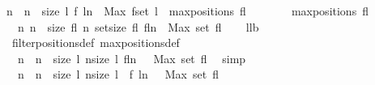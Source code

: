\begin{isabellebody}
{\isacharbrackleft}n\ {\isachardot}\ n\ {\isacharless}{\isacharminus}\ {\isacharbrackleft}{}{\isachardot}{\isachardot}{\isacharless}size\ l{\isacharbrackright}{\isacharcomma}\ f\ {\isacharparenleft}l{\isacharbang}n{\isacharparenright}\ {\isasymge}\ Max\ {\isacharparenleft}f{\isacharbackquote}{\isacharparenleft}set\ l{\isacharparenright}{\isacharparenright}{\isacharbrackright}{\isachardoublequoteclose}\ {\isacharparenleft}\ {\isachardoublequoteopen}maxpositions\ {\isacharparenleft}{\isacharquery}fl{\isacharparenright}\ {\isacharequal}\ {\isacharunderscore}{\isachardoublequoteclose}{\isacharparenright}\isanewline
%
\isadelimproof
%
\endisadelimproof
%
\isatagproof
{}\isamarkupfalse%
\ {\isacharminus}\isanewline
\ \ \isamarkupfalse%
\ {\isachardoublequoteopen}maxpositions\ {\isacharquery}fl\ {\isacharequal}\ \isanewline
\ \ {\isacharbrackleft}n{\isachardot}\ n\ {\isacharless}{\isacharminus}\ {\isacharbrackleft}{}{\isachardot}{\isachardot}{\isacharless}size\ {\isacharquery}fl{\isacharbrackright}{\isacharcomma}\ n{\isasymin}\ set{\isacharbrackleft}{}{\isachardot}{\isachardot}{\isacharless}size\ {\isacharquery}fl{\isacharbrackright}{\isacharcomma}\ {\isacharquery}fl{\isacharbang}n\ {\isasymge}\ Max\ {\isacharparenleft}set\ {\isacharquery}fl{\isacharparenright}{\isacharbrackright}{\isachardoublequoteclose}\isanewline
\ \ \isamarkupfalse%
\ ll{}b\ \isamarkupfalse%
\ filterpositions{}{\isacharunderscore}def\ maxpositions{\isacharunderscore}def\ \isacommand{{\isachardot}}\isamarkupfalse%
\isanewline
\ \ \isamarkupfalse%
\ \isamarkupfalse%
\ {\isachardoublequoteopen}{\isachardot}{\isachardot}{\isachardot}\ {\isacharequal}\ \isanewline
\ \ {\isacharbrackleft}n\ {\isachardot}\ n\ {\isacharless}{\isacharminus}\ {\isacharbrackleft}{}{\isachardot}{\isachardot}{\isacharless}size\ l{\isacharbrackright}{\isacharcomma}\ {\isacharparenleft}n{\isacharless}size\ l{\isacharparenright}{\isacharcomma}\ {\isacharparenleft}{\isacharquery}fl{\isacharbang}n\ \ {\isasymge}\ Max\ {\isacharparenleft}set\ {\isacharquery}fl{\isacharparenright}{\isacharparenright}{\isacharbrackright}{\isachardoublequoteclose}\ \isamarkupfalse%
\ simp\isanewline
\ \ \isamarkupfalse%
\ \isamarkupfalse%
\ {\isachardoublequoteopen}{\isachardot}{\isachardot}{\isachardot}\ {\isacharequal}\ \isanewline
\ \ {\isacharbrackleft}n\ {\isachardot}\ n\ {\isacharless}{\isacharminus}\ {\isacharbrackleft}{}{\isachardot}{\isachardot}{\isacharless}size\ l{\isacharbrackright}{\isacharcomma}\ {\isacharparenleft}n{\isacharless}size\ l{\isacharparenright}\ {\isasymand}\ {\isacharparenleft}f\ {\isacharparenleft}l{\isacharbang}n{\isacharparenright}\ \ {\isasymge}\ Max\ {\isacharparenleft}set\ {\isacharquery}fl{\isacharparenright}{\isacharparenright}{\isacharbrackright}{\isachardoublequoteclose}\ \isanewline

\end{isabellebody}
